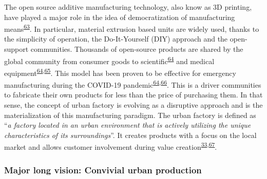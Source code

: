 \documentclass[
  12pt,
  a4paperpaper,
  onecolumn]{article}
\begin{document}
The open source additive manufacturing technology, also know as 3D
printing, have played a major role in the idea of democratization of
manufacturing
means\textsuperscript{\protect\hyperlink{ref-Beltagui2020}{63}}. In
particular, material extrusion based units are widely used, thanks to
the simplicity of operation, the Do-It-Yourself (DIY) approach and the
open-support communities. Thousands of open-source products are shared
by the global community from consumer goods to
scientific\textsuperscript{\protect\hyperlink{ref-Pearce2020a}{64}} and
medical
equipment\textsuperscript{\protect\hyperlink{ref-Pearce2020a}{64},\protect\hyperlink{ref-He2014}{65}}.
This model has been proven to be effective for emergency manufacturing
during the COVID-19
pandemic\textsuperscript{\protect\hyperlink{ref-Pearce2020a}{64},\protect\hyperlink{ref-tan2021}{66}}.
This is a driver communities to fabricate their own products for less
than the price of purchasing them. In that sense, the concept of urban
factory is evolving as a disruptive approach and is the materialization
of this manufacturing paradigm. The urban factory is defined as
``\emph{a factory located in an urban environment that is actively
utilizing the unique characteristics of its surroundings}''. It creates
products with a focus on the local market and allows customer
involvement during value
creation\textsuperscript{\protect\hyperlink{ref-Herrmann2020}{33},\protect\hyperlink{ref-Ijassi2022}{67}}.

\hypertarget{major-long-vision-convivial-urban-production}{%
\subsubsection{Major long vision: Convivial urban
production}\label{major-long-vision-convivial-urban-production}}
\end{document}
